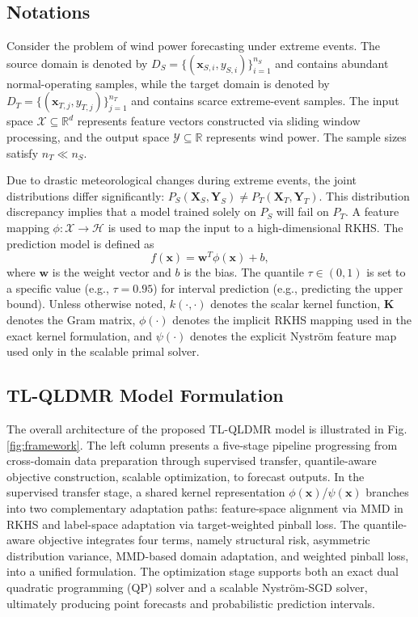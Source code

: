 \documentclass[a4paper]{cas-sc}
\begin{document}
\subsection{Notations}\label{not}
Consider the problem of wind power forecasting under extreme events. The source domain is denoted by $D_{S} = \{(\boldsymbol{x}_{S,i}, y_{S,i})\}_{i=1}^{n_S}$ and contains abundant normal-operating samples, while the target domain is denoted by $D_{T} = \{(\boldsymbol{x}_{T,j}, y_{T,j})\}_{j=1}^{n_T}$ and contains scarce extreme-event samples. The input space $\mathcal{X} \subseteq \mathbb{R}^d$ represents feature vectors constructed via sliding window processing, and the output space $\mathcal{Y} \subseteq \mathbb{R}$ represents wind power. The sample sizes satisfy $n_T \ll n_S$.

Due to drastic meteorological changes during extreme events, the joint distributions differ significantly: $P_S(\boldsymbol{X}_S, \boldsymbol{Y}_S) \neq P_T(\boldsymbol{X}_T, \boldsymbol{Y}_T)$. This distribution discrepancy implies that a model trained solely on $P_S$ will fail on $P_T$.
A feature mapping $\phi: \mathcal{X} \to \mathcal{H}$ is used to map the input to a high-dimensional RKHS. The prediction model is defined as
\begin{equation}
f(\boldsymbol{x}) = \boldsymbol{w}^T \phi(\boldsymbol{x}) + b,
\end{equation}
where $\boldsymbol{w}$ is the weight vector and $b$ is the bias. The quantile $\tau \in (0, 1)$ is set to a specific value (e.g., $\tau=0.95$) for interval prediction (e.g., predicting the upper bound).
Unless otherwise noted, $k(\cdot,\cdot)$ denotes the scalar kernel function, $\boldsymbol{K}$ denotes the Gram matrix, $\phi(\cdot)$ denotes the implicit RKHS mapping used in the exact kernel formulation, and $\psi(\cdot)$ denotes the explicit Nystr\"{o}m feature map used only in the scalable primal solver.

\subsection{TL-QLDMR Model Formulation}\label{MODEL}
The overall architecture of the proposed TL-QLDMR model is illustrated in Fig. \ref{fig:framework}. The left column presents a five-stage pipeline progressing from cross-domain data preparation through supervised transfer, quantile-aware objective construction, scalable optimization, to forecast outputs. In the supervised transfer stage, a shared kernel representation $\phi(\mathbf{x})$/$\psi(\mathbf{x})$ branches into two complementary adaptation paths: feature-space alignment via MMD in RKHS and label-space adaptation via target-weighted pinball loss. The quantile-aware objective integrates four terms, namely structural risk, asymmetric distribution variance, MMD-based domain adaptation, and weighted pinball loss, into a unified formulation. The optimization stage supports both an exact dual quadratic programming (QP) solver and a scalable Nystr\"{o}m-SGD solver, ultimately producing point forecasts and probabilistic prediction intervals.
\end{document}
